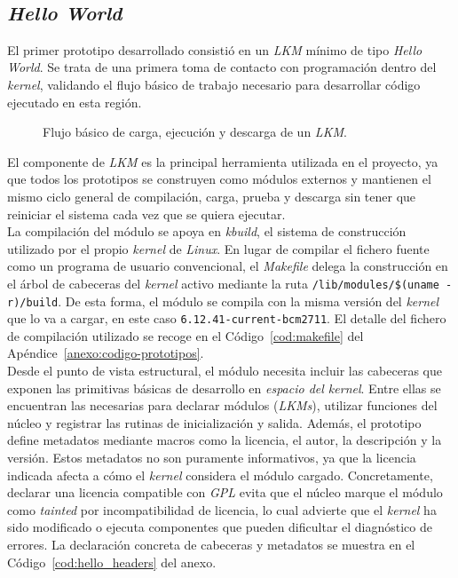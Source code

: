 \

\subsection{\textit{Hello World}}

El primer prototipo desarrollado consistió en un \textit{LKM} mínimo de tipo \textit{Hello World}.
Se trata de una primera toma de contacto con programación dentro del \textit{kernel}, validando el flujo básico de trabajo necesario para desarrollar código ejecutado en esta región.\\

\begin{figure}[h!]
  \centering
  \scalebox{1}{}
  \caption{Flujo básico de carga, ejecución y descarga de un \textit{LKM}.}
  \label{fig:hello_world_scheme}
\end{figure}

El componente de \textit{LKM} es la principal herramienta utilizada en el proyecto, ya que todos los prototipos se construyen como módulos externos y mantienen el mismo ciclo general de compilación, carga, prueba y descarga sin tener que reiniciar el sistema cada vez que se quiera ejecutar.\\

La compilación del módulo se apoya en \textit{kbuild}, el sistema de construcción utilizado por el propio \textit{kernel} de \textit{Linux}.
En lugar de compilar el fichero fuente como un programa de usuario convencional, el \textit{Makefile} delega la construcción en el árbol de cabeceras del \textit{kernel} activo mediante la ruta \texttt{/lib/modules/\$(uname -r)/build}.
De esta forma, el módulo se compila con la misma versión del \textit{kernel} que lo va a cargar, en este caso \texttt{6.12.41-current-bcm2711}.
El detalle del fichero de compilación utilizado se recoge en el Código~\ref{cod:makefile} del Apéndice~\ref{anexo:codigo-prototipos}.\\

Desde el punto de vista estructural, el módulo necesita incluir las cabeceras que exponen las primitivas básicas de desarrollo en \textit{espacio del kernel}.
Entre ellas se encuentran las necesarias para declarar módulos (\textit{LKMs}), utilizar funciones del núcleo y registrar las rutinas de inicialización y salida.
Además, el prototipo define metadatos mediante macros como la licencia, el autor, la descripción y la versión.
Estos metadatos no son puramente informativos, ya que la licencia indicada afecta a cómo el \textit{kernel} considera el módulo cargado.
Concretamente, declarar una licencia compatible con \textit{GPL} evita que el núcleo marque el módulo como \textit{tainted} por incompatibilidad de licencia, lo cual advierte que el \textit{kernel} ha sido modificado o ejecuta componentes que pueden dificultar el diagnóstico de errores.
La declaración concreta de cabeceras y metadatos se muestra en el Código~\ref{cod:hello_headers} del anexo.\\


